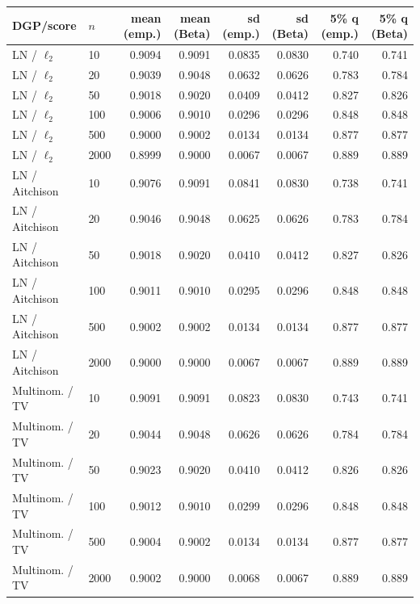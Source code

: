 \begin{tabular}{llrrrrrr}
\toprule
DGP/score & $n$ & mean (emp.) & mean (Beta) & sd (emp.) & sd (Beta) & 5\% q (emp.) & 5\% q (Beta) \\
\midrule
LN / $\ell_2$ & 10 & 0.9094 & 0.9091 & 0.0835 & 0.0830 & 0.740 & 0.741 \\
LN / $\ell_2$ & 20 & 0.9039 & 0.9048 & 0.0632 & 0.0626 & 0.783 & 0.784 \\
LN / $\ell_2$ & 50 & 0.9018 & 0.9020 & 0.0409 & 0.0412 & 0.827 & 0.826 \\
LN / $\ell_2$ & 100 & 0.9006 & 0.9010 & 0.0296 & 0.0296 & 0.848 & 0.848 \\
LN / $\ell_2$ & 500 & 0.9000 & 0.9002 & 0.0134 & 0.0134 & 0.877 & 0.877 \\
LN / $\ell_2$ & 2000 & 0.8999 & 0.9000 & 0.0067 & 0.0067 & 0.889 & 0.889 \\
\midrule
LN / Aitchison & 10 & 0.9076 & 0.9091 & 0.0841 & 0.0830 & 0.738 & 0.741 \\
LN / Aitchison & 20 & 0.9046 & 0.9048 & 0.0625 & 0.0626 & 0.783 & 0.784 \\
LN / Aitchison & 50 & 0.9018 & 0.9020 & 0.0410 & 0.0412 & 0.827 & 0.826 \\
LN / Aitchison & 100 & 0.9011 & 0.9010 & 0.0295 & 0.0296 & 0.848 & 0.848 \\
LN / Aitchison & 500 & 0.9002 & 0.9002 & 0.0134 & 0.0134 & 0.877 & 0.877 \\
LN / Aitchison & 2000 & 0.9000 & 0.9000 & 0.0067 & 0.0067 & 0.889 & 0.889 \\
\midrule
Multinom. / TV & 10 & 0.9091 & 0.9091 & 0.0823 & 0.0830 & 0.743 & 0.741 \\
Multinom. / TV & 20 & 0.9044 & 0.9048 & 0.0626 & 0.0626 & 0.784 & 0.784 \\
Multinom. / TV & 50 & 0.9023 & 0.9020 & 0.0410 & 0.0412 & 0.826 & 0.826 \\
Multinom. / TV & 100 & 0.9012 & 0.9010 & 0.0299 & 0.0296 & 0.848 & 0.848 \\
Multinom. / TV & 500 & 0.9004 & 0.9002 & 0.0134 & 0.0134 & 0.877 & 0.877 \\
Multinom. / TV & 2000 & 0.9002 & 0.9000 & 0.0068 & 0.0067 & 0.889 & 0.889 \\
\bottomrule
\end{tabular}
